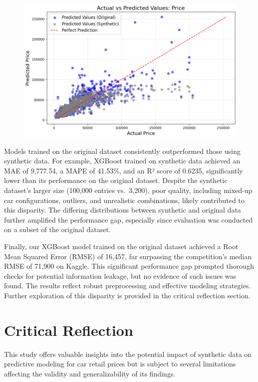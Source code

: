 \documentclass[a4paper,oneside,bibliography=totoc]{scrbook}
\begin{document}
\begin{figure}
	\includegraphics[width=\linewidth]{images/xgb_results_mixed.png}
	\centering
\end{figure}

Models trained on the original dataset consistently outperformed those using synthetic data. For example, XGBoost trained on synthetic data achieved an MAE of 9,777.54, a MAPE of 41.53\%, and an R² score of 0.6235, significantly lower than its performance on the original dataset. Despite the synthetic dataset's larger size (100,000 entries vs.~3,200), poor quality, including mixed-up car configurations, outliers, and unrealistic combinations, likely contributed to this disparity. The differing distributions between synthetic and original data further amplified the performance gap, especially since evaluation was conducted on a subset of the original dataset.

Finally, our XGBoost model trained on the original dataset achieved a Root Mean Squared Error (RMSE) of 16,457, far surpassing the competition's median RMSE of 71,900 on Kaggle. This significant performance gap prompted thorough checks for potential information leakage, but no evidence of such issues was found. The results reflect robust preprocessing and effective modeling strategies. Further exploration of this disparity is provided in the critical reflection section.

\chapter{Critical Reflection}
\label{cha:criticalReflection}

This study offers valuable insights into the potential impact of synthetic data on predictive modeling for car retail prices but is subject to several limitations affecting the validity and generalizability of its findings.
\end{document}
